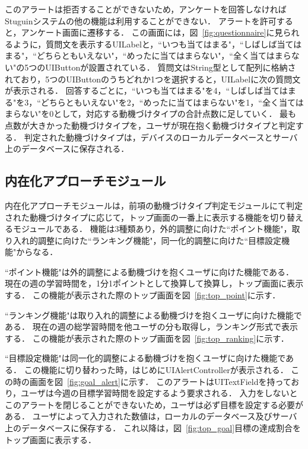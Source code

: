 このアラートは拒否することができないため，アンケートを回答しなければStuguinシステムの他の機能は利用することができない．
アラートを許可すると，アンケート画面に遷移する．
この画面には，図~\ref{fig:questionnaire}に見られるように，質問文を表示するUILabelと，``いつも当てはまる"，``しばしば当てはまる"，``どちらともいえない"，``めったに当てはまらない"，``全く当てはまらない"の5つのUIButtonが設置されている．
質問文はString型として配列に格納されており，5つのUIButtonのうちどれか1つを選択すると，UILabelに次の質問文が表示される．
回答するごとに，``いつも当てはまる"を4，``しばしば当てはまる"を3，``どちらともいえない"を2，``めったに当てはまらない"を1，``全く当てはまらない"を0として，対応する動機づけタイプの合計点数に足していく．
最も点数が大きかった動機づけタイプを，ユーザが現在抱く動機づけタイプと判定する．
判定された動機づけタイプは，デバイスのローカルデータベースとサーバ上のデータベースに保存される．

\subsection{内在化アプローチモジュール}
内在化アプローチモジュールは，前項の動機づけタイプ判定モジュールにて判定された動機づけタイプに応じて，トップ画面の一番上に表示する機能を切り替えるモジュールである．
機能は3種類あり，外的調整に向けた``ポイント機能"，取り入れ的調整に向けた``ランキング機能"，同一化的調整に向けた``目標設定機能"からなる．

``ポイント機能"は外的調整による動機づけを抱くユーザに向けた機能である．
現在の週の学習時間を，1分1ポイントとして換算して換算し，トップ画面に表示する．
この機能が表示された際のトップ画面を図~\ref{fig:top_point}に示す．

``ランキング機能"は取り入れ的調整による動機づけを抱くユーザに向けた機能である．
現在の週の総学習時間を他ユーザの分も取得し，ランキング形式で表示する．
この機能が表示された際のトップ画面を図~\ref{fig:top_ranking}に示す．

``目標設定機能"は同一化的調整による動機づけを抱くユーザに向けた機能である．
この機能に切り替わった時，はじめにUIAlertControllerが表示される．
この時の画面を図~\ref{fig:goal_alert}に示す．
このアラートはUITextFieldを持っており，ユーザは今週の目標学習時間を設定するよう要求される．
入力をしないとこのアラートを閉じることができないため，ユーザは必ず目標を設定する必要がある．
ユーザによって入力された数値は，ローカルのデータベース及びサーバ上のデータベースに保存する．
これ以降は，図~\ref{fig:top_goal}目標の達成割合をトップ画面に表示する．

